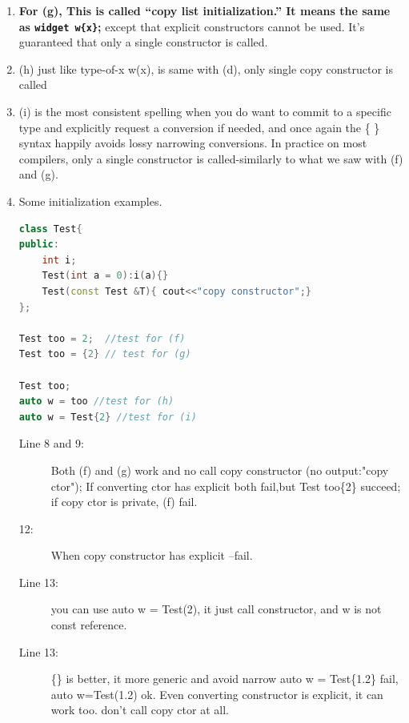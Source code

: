 \documentclass[a4paper,11pt,twoside]{book}
\begin{document}
\begin{itemize}
\begin{enumerate}
		\item \textbf{For (g), This is called “copy list initialization.” It means the same as \texttt{widget w\{x\}};} except that explicit constructors cannot be used. It’s guaranteed that only a single constructor is called.
		
		\item (h) just like type-of-x w(x), is same with (d), only single copy constructor is called
		
		\item (i) is the most consistent spelling when you do want to commit to a specific type and explicitly request a conversion if needed, and once again the \{ \} syntax happily avoids lossy narrowing conversions. In practice on most compilers, only a single constructor is called-similarly to what we saw with (f) and (g).
		
		\item Some initialization examples.
		
\begin{lstlisting}[frame=single, language=c++,mathescape=true]
class Test{
public:
	int i;
	Test(int a = 0):i(a){}
	Test(const Test &T){ cout<<"copy constructor";} 
};
		
Test too = 2;  //test for (f) 
Test too = {2} // test for (g)
		
Test too;  
auto w = too //test for (h)
auto w = Test{2} //test for (i)
\end{lstlisting}
\begin{description}
	\item[Line 8 and 9:] Both (f) and (g) work and no call copy constructor (no output:"copy ctor"); If converting ctor has explicit both fail,but Test too\{2\} succeed; if copy ctor is private, (f) fail.

	\item[12:] When copy constructor has explicit --fail.
	
	\item[Line 13:] you can use auto w = Test(2), it just call constructor, and w is not const reference.
	\item[Line 13:]  \{\} is better, it more generic and avoid narrow auto w = Test\{1.2\} fail, auto w=Test(1.2) ok. Even converting constructor is explicit, it can work too. don't call copy ctor at all.
\end{description}

	\end{enumerate}

\end{itemize}
\end{document}
